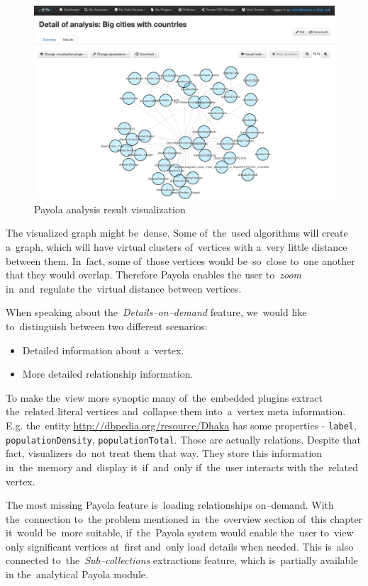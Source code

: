 \begin{figure}
	\centering
	\includegraphics[width=140mm]{img/payola.png}
	\caption{Payola analysis result visualization}
	\label{fig:palyola-vis}
\end{figure}


The visualized graph might be~dense. Some of~the~used algorithms will create a~graph, which
will have virtual clusters of~vertices with a~very little distance between them. In~fact, some of~those
vertices would be~so~close to~one another that they would overlap. Therefore Payola enables the
user to~\emph{zoom} in~and~regulate the~virtual distance between vertices.

When speaking about the~\emph{Details--on--demand} feature, we~would like to~distinguish
between two different
scenarios:

\begin{itemize}
\item Detailed information about a~vertex.
\item More detailed relationship information.
\end{itemize}

To make the~view more synoptic many of~the~embedded plugins extract the~related literal
vertices and~collapse them into~a~vertex meta information. E.g. the~entity
\url{http://dbpedia.org/resource/Dhaka} has some properties - \texttt{label},
\texttt{populationDensity}, \texttt{populationTotal}.
Those are actually relations. Despite that fact, visualizers do~not treat them
that way. They store this information in~the~memory and~display it~if~and~only if~the~user
interacts with the~related vertex.

The most missing Payola feature is~loading relationships on--demand. With the~connection to~the
problem
mentioned in~the~overview section of~this chapter it~would be~more suitable, if~the~Payola system
would enable the~user to~view only significant vertices at~first and~only load details when needed.
This is~also connected to~the~\emph{Sub--collections} extractions feature, which is~partially available
in the~analytical Payola module.

